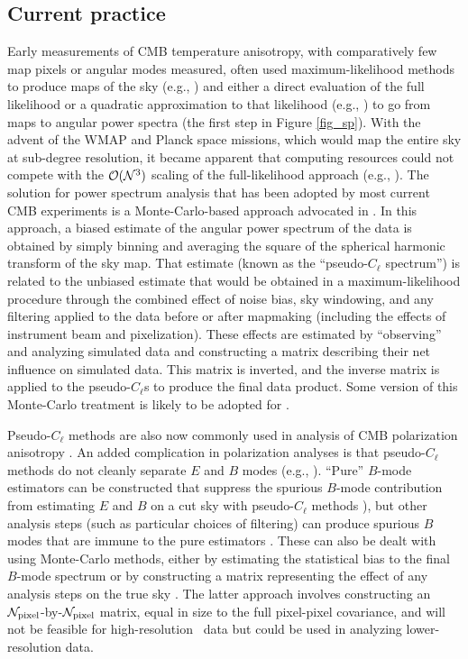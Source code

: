 \subsection{Current practice}
\label{se:current}
Early measurements of CMB temperature anisotropy, with comparatively few map pixels or angular modes
measured, often used maximum-likelihood methods to produce maps of the sky (e.g., \cite{Wright:1996dk}) and
either a direct evaluation of the full likelihood or a quadratic approximation to that likelihood (e.g., \cite{Bond:1998zw}) to go from 
maps to angular power spectra (the first step in Figure \ref{fig_sp}). With the advent of the WMAP and Planck space 
missions, which would map the entire sky at sub-degree resolution, it became apparent that computing
resources could not compete with the $\mathcal{O}({\cal N}^3)$ scaling of the full-likelihood approach 
(e.g., \cite{Borrill:1998tn}). The solution for power spectrum analysis
that has been adopted by most current CMB experiments is a
Monte-Carlo-based approach advocated in \cite{Hivon:2001jp}. In this approach, a biased estimate of
the angular power spectrum of the data is obtained by simply binning and averaging the square 
of the spherical harmonic transform of the sky map. That estimate (known as the 
``pseudo-$C_\ell$ spectrum'') is related to the unbiased 
estimate that would be obtained in a maximum-likelihood procedure through the combined effect
of noise bias, sky windowing, and any filtering applied to the data before or after mapmaking
(including the effects of instrument beam and pixelization). These effects are estimated by ``observing''
and analyzing simulated data and constructing a matrix describing their net influence on simulated data. 
This matrix is inverted, and the inverse matrix is applied to the pseudo-$C_\ell$s to produce the 
final data product. Some version of this Monte-Carlo treatment is likely to be 
adopted for \cmbexp. 

Pseudo-$C_\ell$ methods are also now commonly used in analysis of CMB polarization anisotropy
\cite{Aghanim:2015xee,Naess:2014wtr,Crites:2014prc}. An added complication in polarization analyses is that 
pseudo-$C_\ell$ methods do not cleanly separate $E$ and $B$ modes (e.g., \cite{Challinor:2005jy}).
``Pure'' $B$-mode estimators can be constructed that suppress the spurious $B$-mode contribution
from estimating $E$ and $B$ on a cut sky with pseudo-$C_\ell$ methods \cite{Smith:2005gi}), but 
other analysis steps (such as particular choices of filtering) can produce spurious $B$ modes that
are immune to the pure estimators \cite{Keisler:2015hfa}. These can also be dealt with using Monte-Carlo
methods, either by estimating the statistical bias to the final $B$-mode spectrum or by constructing
a matrix representing the effect of any analysis steps on the true sky \cite{Ade:2014xna}. The latter
approach involves constructing an ${\cal N}_\mathrm{pixel}$-by-${\cal N}_\mathrm{pixel}$ matrix, equal in size to the 
full pixel-pixel covariance, and will not be feasible for high-resolution \cmbexp\ data but could be 
used in analyzing lower-resolution data.

